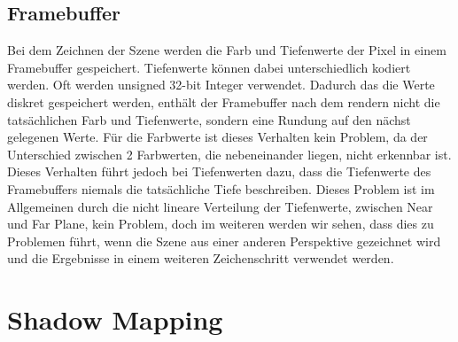 \section{Framebuffer}
Bei dem Zeichnen der Szene werden die Farb und Tiefenwerte der Pixel in einem Framebuffer gespeichert.
Tiefenwerte können dabei unterschiedlich kodiert werden. Oft werden unsigned 32-bit Integer verwendet.
Dadurch das die Werte diskret gespeichert werden, enthält der Framebuffer nach dem rendern nicht die tatsächlichen Farb und 
Tiefenwerte, sondern eine Rundung auf den nächst gelegenen Werte.
Für die Farbwerte ist dieses Verhalten kein Problem, da der Unterschied zwischen 2 Farbwerten, die nebeneinander liegen, nicht erkennbar ist.
Dieses Verhalten führt jedoch bei Tiefenwerten dazu, dass die Tiefenwerte des Framebuffers niemals die tatsächliche Tiefe beschreiben.
Dieses Problem ist im Allgemeinen durch die nicht lineare Verteilung der Tiefenwerte, zwischen Near und Far Plane, kein Problem, 
doch im weiteren werden wir sehen, dass dies zu Problemen führt, wenn die Szene aus einer anderen Perspektive gezeichnet wird 
und die Ergebnisse in einem weiteren Zeichenschritt verwendet werden.

\chapter{Shadow Mapping} %
\label{section:shadow-mapping}
